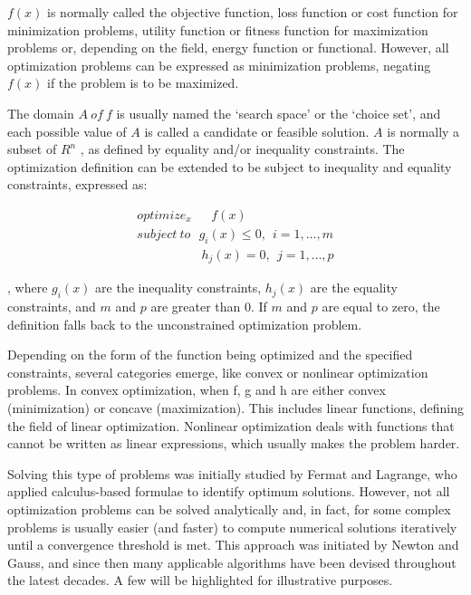$ f(x) $  is normally called the objective function, loss function or cost function for minimization problems, utility function or fitness function for maximization problems or, depending on the field, energy function or functional. However, all optimization problems can be expressed as minimization problems, negating  $ f(x) $  if the problem is to be maximized.

The domain  $ A ~ of ~ f $ is usually named the ‘search space’ or the ‘choice set’, and each possible value of  $ A $  is called a candidate or feasible solution.  $ A $  is normally a subset of  $ R^{n} $ , as defined by equality and/or inequality constraints. The optimization definition can be extended to be subject to inequality and equality constraints, expressed as:

\begin{align}
	optimize_{x}~~~~~~~ f(x) \nonumber \\
	subject~to~~~  g_{i}(x)  \leq 0,~~ i=1,  \ldots ,m \nonumber \\
	~~~~~~~~~~~~~~~~~~~~~~~ h_{j}(x) =0,~~ j=1,  \ldots ,p
\end{align}

, where  \( g_{i}(x)  \)  are the inequality constraints,  \( h_{j}(x)  \)  are the equality constraints, and  \( m \)  and  \( p \)  are greater than 0. If  \( m \)  and  \( p \)  are equal to zero, the definition falls back to the unconstrained optimization problem.

Depending on the form of the function being optimized and the specified constraints, several categories emerge, like convex or nonlinear optimization problems. In convex optimization, when f, g and h are either convex (minimization) or concave (maximization). This includes linear functions, defining the field of linear optimization. Nonlinear optimization deals with functions that cannot be written as linear expressions, which usually makes the problem harder.

Solving this type of problems was initially studied by Fermat and Lagrange, who applied calculus-based formulae to identify optimum solutions. However, not all optimization problems can be solved analytically and, in fact, for some complex problems is usually easier (and faster) to compute numerical solutions iteratively until a convergence threshold is met. This approach was initiated by Newton and Gauss, and since then many applicable algorithms have been devised throughout the latest decades. A few will be highlighted for illustrative purposes.

